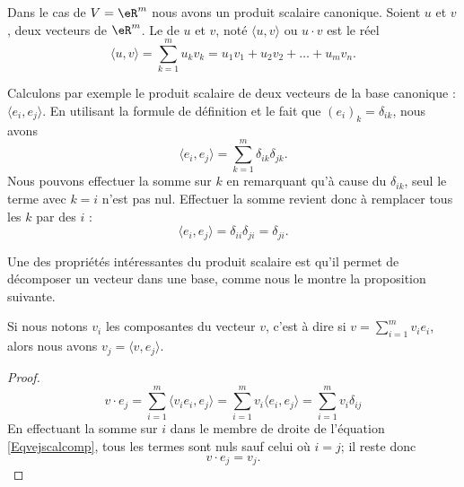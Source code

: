 \begin{definition}      \label{DefYNWUFc}
    Dans le cas de \( V=\eR^m\) nous avons un produit scalaire canonique. Soient $u$ et $v$, deux vecteurs de $\eR^m$. Le  de $u$ et $v$, noté $\langle u, v\rangle $ ou $u\cdot v$ est le réel
	\begin{equation}		\label{EqDefProdScalsumii}
		\langle u, v\rangle =\sum_{k=1}^m u_kv_k=u_1v_1+u_2v_2+\ldots+u_mv_n.
	\end{equation}
\end{definition}

Calculons par exemple le produit scalaire de deux vecteurs de la base canonique : $\langle e_i, e_j\rangle $. En utilisant la formule de définition et le fait que $(e_i)_k=\delta_{ik}$, nous avons
\begin{equation}
	\langle e_i, e_j\rangle =\sum_{k=1}^m\delta_{ik}\delta_{jk}.
\end{equation}
Nous pouvons effectuer la somme sur $k$ en remarquant qu'à cause du $\delta_{ik}$, seul le terme avec $k=i$ n'est pas nul. Effectuer la somme revient donc à remplacer tous les $k$ par des $i$ :
\begin{equation}
	\langle e_i, e_j\rangle =\delta_{ii}\delta_{ji}=\delta_{ji}.
\end{equation}

Une des propriétés intéressantes du produit scalaire est qu'il permet de décomposer un vecteur dans une base, comme nous le montre la proposition suivante.

\begin{proposition}		\label{PropScalCompDec}
	Si nous notons $v_i$ les composantes du vecteur $v$, c'est à dire si $v=\sum_{i=1}^m v_ie_i$, alors nous avons $v_j=\langle v, e_j\rangle $.
\end{proposition}

\begin{proof}
	\begin{equation}		\label{Eqvejscalcomp}
		v\cdot e_j=\sum_{i=1}^m\langle v_ie_i, e_j\rangle =\sum_{i=1}^mv_i\langle e_i, e_j\rangle =\sum_{i=1}^mv_i\delta_{ij}
	\end{equation}
	En effectuant la somme sur $i$ dans le membre de droite de l'équation \eqref{Eqvejscalcomp}, tous les termes sont nuls sauf celui où $i=j$; il reste donc
	\begin{equation}
		v\cdot e_j=v_j.
	\end{equation}
\end{proof}

